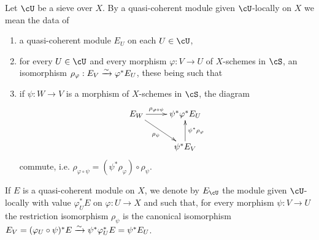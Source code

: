 \subsubsection{}\label{I:1-4-4}

Let $\cU$ be a sieve over $X$. By a quasi-coherent module given
$\cU$-locally on $X$ we mean the data of
\begin{enumerate}[\indent a)]
  \item a quasi-coherent module $E_U$ on each $U\in\cU$, 
  \item for every $U\in\cU$ and every morphism $\varphi:V\to U$ of
    $X$-schemes in $\cS$, an isomorphism
    $\rho_\varphi:E_V\xrightarrow\sim \varphi^* E_U$, these being such that
  \item if $\psi:W\to V$ is a morphism of $X$-schemes in $\cS$, the
    diagram 
    \[\xymatrix{
      E_W \ar[r]^-{\rho_{\varphi\circ\psi}} \ar[dr]_-{\rho_\psi} 
        & \psi^*\varphi^* E_U \\
      & \psi^* E_V \ar[u]_-{\psi^*\rho_\varphi}
    }\]
    commute, i.e.
    $\rho_{\varphi\circ\psi}=(\psi^*\rho_\varphi)\circ \rho_\psi$. 
\end{enumerate}

If $E$ is a quasi-coherent module on $X$, we denote by $E_\cU$ the module
given $\cU$-locally with value $\varphi_U^* E$ on $\varphi:U\to X$ and such that,
for every morphism $\psi:V\to U$ the restriction isomorphism $\rho_\psi$
is the canonical isomorphism
$E_V=(\varphi_U\circ \psi)^* E\xrightarrow\sim \psi^* \varphi_U^* E = \psi^* E_U$. 



